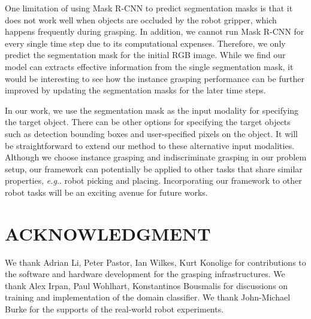 \documentclass[letterpaper, 10 pt, conference]{ieeeconf}  %
\makeatletter
\DeclareRobustCommand\onedot{\futurelet\@let@token\@onedot}
\def\@onedot{\ifx\@let@token.\else.\null\fi\xspace}
\def\eg{\emph{e.g}\onedot} \def\Eg{\emph{E.g}\onedot}
\makeatother
\begin{document}
One limitation of using Mask R-CNN to predict segmentation masks is that it does not work well when objects are occluded by the robot gripper, which happens frequently during grasping. In addition, we cannot run Mask R-CNN for every single time step due to its computational expenses. Therefore, we only predict the segmentation mask for the initial RGB image. While we find our model can extracts effective information from the single segmentation mask, it would be interesting to see how the instance grasping performance can be further improved by updating the segmentation masks for the later time steps.

In our work, we use the segmentation mask as the input modality for specifying the target object. There can be other options for specifying the target objects such as detection bounding boxes and user-specified pixels on the object. It will be straightforward to extend our method to these alternative input modalities. Although we choose instance grasping and indiscriminate grasping in our problem setup, our framework can potentially be applied to other tasks that share similar properties, \eg robot picking and placing. Incorporating our framework to other robot tasks will be an exciting avenue for future works. 



\section*{ACKNOWLEDGMENT}
We thank Adrian Li, Peter Pastor, Ian Wilkes, Kurt Konolige for contributions to the software and hardware development for the grasping infrastructures. We thank Alex Irpan, Paul Wohlhart, Konstantinos Bousmalis for discussions on training and implementation of the domain classifier. We thank John-Michael Burke for the supports of the real-world robot experiments.

\addtolength{\textheight}{-12cm}   %
\end{document}

